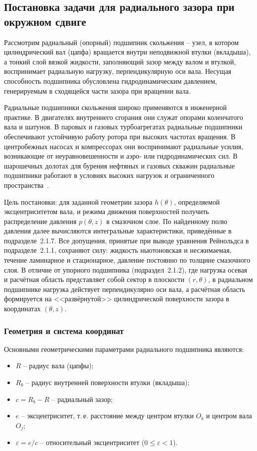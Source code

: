 \subsection{Постановка задачи для радиального зазора при окружном сдвиге}


Рассмотрим радиальный (опорный) подшипник скольжения -- узел, в котором цилиндрический вал (цапфа) вращается внутри неподвижной втулки (вкладыша), а тонкий слой вязкой жидкости, заполняющий зазор между валом и втулкой, воспринимает радиальную нагрузку, перпендикулярную оси вала. Несущая способность подшипника обусловлена гидродинамическим давлением, генерируемым в сходящейся части зазора при вращении вала.

Радиальные подшипники скольжения широко применяются в инженерной практике. В двигателях внутреннего сгорания они служат опорами коленчатого вала и шатунов. В паровых и газовых турбоагрегатах радиальные подшипники обеспечивают устойчивую работу ротора при высоких частотах вращения. В центробежных насосах и компрессорах они воспринимают радиальные усилия, возникающие от неуравновешенности и аэро- или гидродинамических сил. В шарошечных долотах для бурения нефтяных и газовых скважин радиальные подшипники работают в условиях высоких нагрузок и ограниченного пространства~\cite{sfyris2012,chasalevris2013}.

Цель постановки: для заданной геометрии зазора $h(\theta)$, определяемой эксцентриситетом вала, и режима движения поверхностей получить распределение давления $p(\theta, z)$ в смазочном слое. По найденному полю давления далее вычисляются интегральные характеристики, приведённые в подразделе~2.1.7. Все допущения, принятые при выводе уравнения Рейнольдса в подразделе~2.1.1, сохраняют силу: жидкость ньютоновская и несжимаемая, течение ламинарное и стационарное, давление постоянно по толщине смазочного слоя. В отличие от упорного подшипника (подраздел~2.1.2), где нагрузка осевая и расчётная область представляет собой сектор в плоскости $(r, \theta)$, в радиальном подшипнике нагрузка действует перпендикулярно оси вала, а расчётная область формируется на <<развёрнутой>> цилиндрической поверхности зазора в координатах $(\theta, z)$.


\subsubsection*{Геометрия и система координат}

Основными геометрическими параметрами радиального подшипника являются:
\begin{itemize}
\item $R$ -- радиус вала (цапфы);
\item $R_b$ -- радиус внутренней поверхности втулки (вкладыша);
\item $c = R_b - R$ -- радиальный зазор;
\item $e$ -- эксцентриситет, т.\,е. расстояние между центром втулки $O_b$ и центром вала $O_j$;
\item $\varepsilon = e/c$ -- относительный эксцентриситет ($0 \leq \varepsilon < 1$).
\end{itemize}

